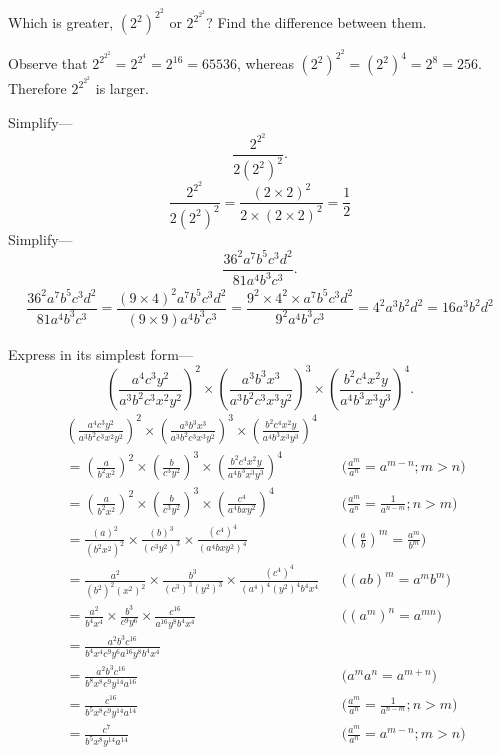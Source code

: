 \documentclass[DIN, pagenumber=false, fontsize=11pt, parskip=half]{scrartcl}
\begin{document}
\begin{problems}[from=1,step=1]
    \problem Which is greater, $(2^2)^{2^2}$ or $2^{2^{2^2}}$? Find the difference between them.

    \answer Observe that $2^{2^{2^2}} = 2^{2^{4}} = 2^{16} = 65536$, whereas $(2^2)^{2^{2}} = (2^2)^4 = 2^8 = 256$. Therefore $2^{2^{2^2}}$ is larger.

    \problem Simplify---
    \[
        \frac{2^{2^2}}{2(2^2)^2}.
    \]
    \answer
    \[
        \frac{2^{2^2}}{2(2^2)^2} = \frac{(2 \times 2)^2}{2\times (2 \times 2)^2} = \frac{1}{2}
    \]
    \problem Simplify---
    \[
        \frac{36^2 a^7 b^5 c^3 d^2}{81 a^4 b^3 c^3}.
    \]
    \answer
    \begin{align*}
        \dfrac{36^2 a^7 b^5 c^3 d^2}{81 a^4 b^3 c^3} =
        \dfrac{(9 \times 4)^2 a^7 b^5 c^3 d^2}{(9 \times 9) a^4 b^3 c^3} =
        \dfrac{9^2 \times 4^2 \times a^7 b^5 c^3 d^2}{9^2 a^4 b^3 c^3} = 
        4^2a^3b^2d^2 = 16a^3b^2d^2
    \end{align*}


    \problem Express in its simplest form---
    \[
        \left(\frac{a^4 c^3 y^2}{a^3 b^2 c^3 x^2 y^2}\right)^{2} \times \left(\frac{a^3 b^3 x^3}{a^3 b^2 c^3 x^3 y^2}\right)^{3} \times \left(\frac{b^2 c^4 x^2 y}{a^4 b^3 x^3 y^3}\right)^{4}.
    \]
    \answer 
    \begin{align*}
        &\left(\frac{a^4c^3y^2}{a^3b^2c^3x^2y^2}\right)^2 \times
        \left(\frac{a^3b^3x^3}{a^3b^2c^3x^3y^2}\right)^3 \times 
        \left(\frac{b^2c^4x^2y}{a^4b^3x^3y^3}\right)^4 \\ 
        &= \left(\frac{a}{b^2x^2}\right)^2 \times \left(\frac{b}{c^3y^2}\right)^3 \times \left(\frac{b^2c^4x^2y}{a^4b^3x^3y^3}\right)^4 && \text{($\tfrac{a^m}{a^n} = a^{m-n}; m>n$)}\\ 
        &= \left(\frac{a}{b^2x^2}\right)^2 \times \left(\frac{b}{c^3y^2}\right)^3 \times \left(\frac{c^4}{a^4bxy^2}\right)^4  && \text{($\tfrac{a^m}{a^n} = \tfrac{1}{a^{n-m}}; n>m $)}\\ 
        &= \frac{(a)^2}{(b^2x^2)^2} \times \frac{(b)^3}{(c^3y^2)^3} \times \frac{(c^4)^4}{(a^4bxy^2)^4} && \text{($(\tfrac{a}{b})^m = \tfrac{a^m}{b^m}$)}\\ 
        &= \frac{a^2}{(b^2)^2(x^2)^2} \times \frac{b^3}{(c^3)^3(y^2)^3} \times \frac{(c^4)^4}{(a^4)^4(y^2)^4b^4x^4} && \text{($(ab)^m = a^mb^m$)}\\ 
        &= \frac{a^2}{b^4x^4} \times \frac{b^3}{c^9y^6} \times \frac{c^{16}}{a^{16}y^8b^4x^4} && \text{($(a^m)^n = a^{mn}$)}\\ 
        &= \frac{a^2b^3c^{16}}{b^4x^4c^9y^6a^{16}y^8b^4x^4}\\ 
        &= \frac{a^2b^3c^{16}}{b^8x^8c^9y^{14}a^{16}} && \text{($a^ma^n = a^{m+n}$)}\\ 
        &= \frac{c^{16}}{b^5x^8c^9y^{14}a^{14}} && \text{($\tfrac{a^m}{a^n} = \tfrac{1}{a^{n-m}}; n>m$)}\\ 
        &= \frac{c^7}{b^5x^8y^{14}a^{14}} && \text{($\tfrac{a^m}{a^n} = a^{m-n}; m>n$)}
    \end{align*}



\end{problems}
\end{document}
